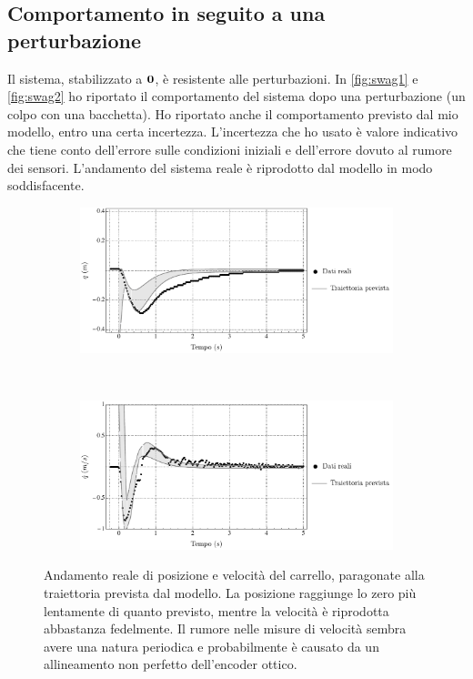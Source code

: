 \subsection{Comportamento in seguito a una perturbazione}
Il sistema, stabilizzato a $\mathbf{0}$, è resistente alle perturbazioni.
In \autoref{fig:swag1} e \autoref{fig:swag2} ho riportato il
comportamento del sistema dopo una perturbazione (un colpo con
una bacchetta).
Ho riportato anche il comportamento previsto dal mio modello,
entro una certa incertezza.
L'incertezza che ho usato è valore indicativo
che tiene conto dell'errore sulle condizioni iniziali e
dell'errore dovuto al rumore dei sensori.
L'andamento del sistema reale è riprodotto
dal modello in modo soddisfacente.



\begin{figure}
    \centering
    \begin{subfigure}[]{\textwidth}
        \centering
        \includegraphics[width=\textwidth]{assets/x-plot}
    \end{subfigure}
    \\[5ex]
    \begin{subfigure}[]{\textwidth}
        \centering
        \includegraphics[width=\textwidth]{assets/v-plot}
    \end{subfigure}

    \caption[Resistenza alle perturbazioni: posizione e velocità]{
        Andamento reale di posizione e velocità del carrello,
        paragonate alla traiettoria prevista dal modello.
        La posizione raggiunge lo zero più lentamente di quanto previsto,
        mentre la velocità è riprodotta abbastanza fedelmente.
        Il rumore nelle misure di velocità sembra avere una natura periodica
        e probabilmente è causato da un allineamento non perfetto dell'encoder
        ottico.
    }
    \label{fig:swag1}
\end{figure}


